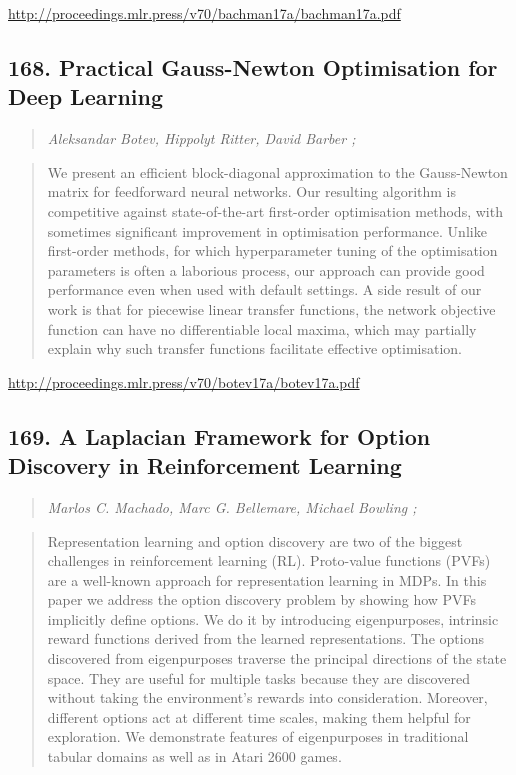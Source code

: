 \documentclass{article}
\begin{document}
\href{http://proceedings.mlr.press/v70/bachman17a/bachman17a.pdf}{http://proceedings.mlr.press/v70/bachman17a/bachman17a.pdf}

\subsection{168. Practical Gauss-Newton Optimisation for Deep Learning}

\begin{quote}
\footnotesize{\textit{Aleksandar Botev, Hippolyt Ritter, David Barber ;}}

\end{quote}

\begin{quote}
    We present an efficient block-diagonal approximation to the Gauss-Newton matrix for feedforward neural networks. Our resulting algorithm is competitive against state-of-the-art first-order optimisation methods, with sometimes significant improvement in optimisation performance. Unlike first-order methods, for which hyperparameter tuning of the optimisation parameters is often a laborious process, our approach can provide good performance even when used with default settings. A side result of our work is that for piecewise linear transfer functions, the network objective function can have no differentiable local maxima, which may partially explain why such transfer functions facilitate effective optimisation.  
\end{quote}

\href{http://proceedings.mlr.press/v70/botev17a/botev17a.pdf}{http://proceedings.mlr.press/v70/botev17a/botev17a.pdf}

\subsection{169. A Laplacian Framework for Option Discovery in Reinforcement Learning}

\begin{quote}
\footnotesize{\textit{Marlos C. Machado, Marc G. Bellemare, Michael Bowling ;}}

\end{quote}

\begin{quote}
    Representation learning and option discovery are two of the biggest challenges in reinforcement learning (RL). Proto-value functions (PVFs) are a well-known approach for representation learning in MDPs. In this paper we address the option discovery problem by showing how PVFs implicitly define options. We do it by introducing eigenpurposes, intrinsic reward functions derived from the learned representations. The options discovered from eigenpurposes traverse the principal directions of the state space. They are useful for multiple tasks because they are discovered without taking the environment’s rewards into consideration. Moreover, different options act at different time scales, making them helpful for exploration. We demonstrate features of eigenpurposes in traditional tabular domains as well as in Atari 2600 games.  
\end{quote}
\end{document}
